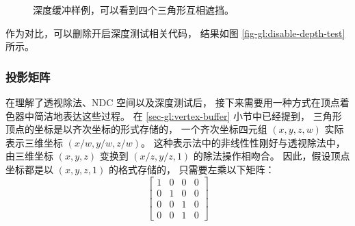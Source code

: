 \documentclass[fontset=windows]{ctexart}
\begin{document}
\begin{figure}[htbp]
\centering
{}
\caption{深度缓冲样例，可以看到四个三角形互相遮挡。}
\end{figure}

作为对比，可以删除开启深度测试相关代码，
结果如图 \ref{fig-gl:disable-depth-test} 所示。

\subsubsection{投影矩阵}

\label{sec-gl:projection-matrix}

在理解了透视除法、NDC 空间以及深度测试后，
接下来需要用一种方式在顶点着色器中简洁地表达这些过程。
在 \ref{sec-gl:vertex-buffer} 小节中已经提到，
三角形顶点的坐标是以齐次坐标的形式存储的，
一个齐次坐标四元组 $(x, y, z, w)$ 实际表示三维坐标 $(x/w, y/w, z/w)$。
这种表示法中的非线性性刚好与透视除法中，
由三维坐标 $(x, y, z)$ 变换到 $(x/z, y/z, 1)$ 的除法操作相吻合。
因此，假设顶点坐标都是以 $(x, y, z, 1)$ 的格式存储的，
只需要左乘以下矩阵：
$$
\left[    
\begin{matrix}
    1&0&0&0\\
    0&1&0&0\\
    0&0&1&0\\
    0&0&1&0
\end{matrix}
\right]
$$
\end{document}
